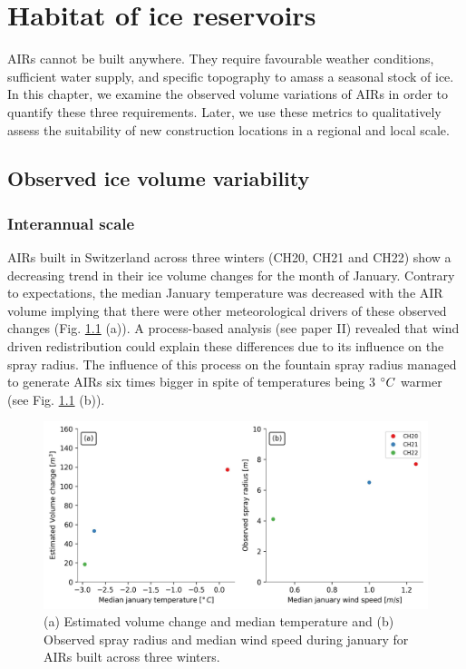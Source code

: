 \chapter{Habitat of ice reservoirs}


AIRs cannot be built anywhere. They require favourable weather conditions, sufficient water supply, and specific
topography to amass a seasonal stock of ice. In this chapter, we examine the observed volume variations of AIRs
in order to quantify these three requirements. Later, we use these metrics to qualitatively assess the
suitability of new construction locations in a regional and local scale.

\section{Observed ice volume variability}

\subsection{Interannual scale}

AIRs built in Switzerland across three winters (CH20, CH21 and CH22) show a decreasing trend in their ice volume
changes for the month of January. Contrary to expectations, the median January temperature was decreased with
the AIR volume implying that there were other meteorological drivers of these observed changes (Fig.
\ref{fig:CH_diffs} (a)). A process-based analysis (see paper II) revealed that wind driven redistribution could
explain these differences due to its influence on the spray radius. The influence of this process on the
fountain spray radius managed to generate AIRs six times bigger in spite of temperatures being 3 $^{\circ} C$
warmer (see Fig. \ref{fig:CH_diffs} (b)). 

\begin{figure}[htb]
\centering
\includegraphics[width=\textwidth]{figs/CH_diffs.jpg}
\caption{(a) Estimated volume change and median temperature and (b) Observed spray radius and median wind speed
during january for AIRs built across three winters. } 
\label{fig:CH_diffs}
\end{figure}


